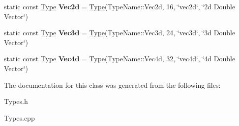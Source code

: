 \begin{DoxyCompactItemize}
\item 
\mbox{\label{class_arcana_1_1_types_a887cb56bdfddec4402b94538e30a7e8b}} 
static const \mbox{\hyperlink{class_arcana_1_1_type}{Type}} {\bfseries Vec2d} = \mbox{\hyperlink{class_arcana_1_1_type}{Type}}(Type\+Name\+::\+Vec2d, 16, \char`\"{}vec2d\char`\"{}, \char`\"{}2d Double Vector\char`\"{})
\item 
\mbox{\label{class_arcana_1_1_types_a82c3f63447bac2cf6d8b1640f051442f}} 
static const \mbox{\hyperlink{class_arcana_1_1_type}{Type}} {\bfseries Vec3d} = \mbox{\hyperlink{class_arcana_1_1_type}{Type}}(Type\+Name\+::\+Vec3d, 24, \char`\"{}vec3d\char`\"{}, \char`\"{}3d Double Vector\char`\"{})
\item 
\mbox{\label{class_arcana_1_1_types_a15bd4ce7176fa1182883b3e1cd5fbfd1}} 
static const \mbox{\hyperlink{class_arcana_1_1_type}{Type}} {\bfseries Vec4d} = \mbox{\hyperlink{class_arcana_1_1_type}{Type}}(Type\+Name\+::\+Vec4d, 32, \char`\"{}vec4d\char`\"{}, \char`\"{}4d Double Vector\char`\"{})
\end{DoxyCompactItemize}


The documentation for this class was generated from the following files\+:\begin{DoxyCompactItemize}
\item 
Types.\+h\item 
Types.\+cpp\end{DoxyCompactItemize}
